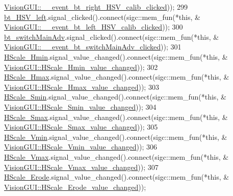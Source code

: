 \begin{DoxyCode}
      \hyperlink{class_vision_g_u_i_a5de4edcfe2bd349f940dc605a52bc70b}{VisionGUI::\_\_event\_bt\_right\_HSV\_calib\_clicked}));
299     \hyperlink{class_vision_g_u_i_a98323988d4a353190a02c827de0cecbf}{bt\_HSV\_left}.signal\_clicked().connect(sigc::mem\_fun(*\textcolor{keyword}{this}, &
      \hyperlink{class_vision_g_u_i_aa6d54a685b4bddbad91778a442fd7c8e}{VisionGUI::\_\_event\_bt\_left\_HSV\_calib\_clicked}));
300     \hyperlink{class_vision_g_u_i_a62b2427b20780649d71611c6cdb6a10a}{bt\_switchMainAdv}.signal\_clicked().connect(sigc::mem\_fun(*\textcolor{keyword}{this}, &
      \hyperlink{class_vision_g_u_i_a5e1378fbaf15105bd898f6fd9e2d3d0e}{VisionGUI::\_\_event\_bt\_switchMainAdv\_clicked}));
301     \hyperlink{class_vision_g_u_i_a8cc0de8ce9ca9c05d1c47176b724ecc3}{HScale\_Hmin}.signal\_value\_changed().connect(sigc::mem\_fun(*\textcolor{keyword}{this}, &
      \hyperlink{class_vision_g_u_i_a8c01178ecd9d517e941bd6075d69bcdd}{VisionGUI::HScale\_Hmin\_value\_changed}));
302     \hyperlink{class_vision_g_u_i_a0b1bb9b8a70bd1f93427f71d0e885313}{HScale\_Hmax}.signal\_value\_changed().connect(sigc::mem\_fun(*\textcolor{keyword}{this}, &
      \hyperlink{class_vision_g_u_i_ad12a91dfc3c8cd3ef213d4d518d85267}{VisionGUI::HScale\_Hmax\_value\_changed}));
303     \hyperlink{class_vision_g_u_i_a23eb7af1cc6d3a055892de4704b48126}{HScale\_Smin}.signal\_value\_changed().connect(sigc::mem\_fun(*\textcolor{keyword}{this}, &
      \hyperlink{class_vision_g_u_i_a4e521dabf97b0820f40272290b471ed2}{VisionGUI::HScale\_Smin\_value\_changed}));
304     \hyperlink{class_vision_g_u_i_a147e8499bd7412fdb732103c0754f013}{HScale\_Smax}.signal\_value\_changed().connect(sigc::mem\_fun(*\textcolor{keyword}{this}, &
      \hyperlink{class_vision_g_u_i_a37cc33977d0cfdb559bf156ffad949ad}{VisionGUI::HScale\_Smax\_value\_changed}));
305     \hyperlink{class_vision_g_u_i_a8a1e7f6d4357eceab8e47fe0fb523cf9}{HScale\_Vmin}.signal\_value\_changed().connect(sigc::mem\_fun(*\textcolor{keyword}{this}, &
      \hyperlink{class_vision_g_u_i_aaba5ce7bcd87c9ce9101f409695b3bd9}{VisionGUI::HScale\_Vmin\_value\_changed}));
306     \hyperlink{class_vision_g_u_i_ab277d08dcce9e2521b9d4c542be69247}{HScale\_Vmax}.signal\_value\_changed().connect(sigc::mem\_fun(*\textcolor{keyword}{this}, &
      \hyperlink{class_vision_g_u_i_a8446a9425209abafa824d6a8cb539248}{VisionGUI::HScale\_Vmax\_value\_changed}));
307     \hyperlink{class_vision_g_u_i_ad4bc77416f4e50fa03a7cc7f64a2d78e}{HScale\_Erode}.signal\_value\_changed().connect(sigc::mem\_fun(*\textcolor{keyword}{this}, &
      \hyperlink{class_vision_g_u_i_a945e5a987bdfb5b1d5d97bd18231d211}{VisionGUI::HScale\_Erode\_value\_changed}));

\end{DoxyCode}
